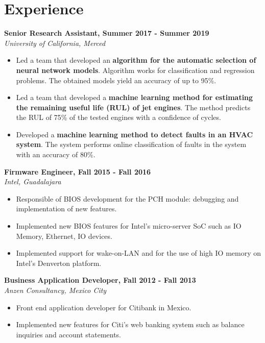 \documentclass[a4paper,10pt]{article}
\begin{document}

\begin{minipage}[H]{0.7\textwidth}%

\section{Experience}
\textbf{Senior Research Assistant, Summer 2017 - Summer 2019}\\
\emph{University of California, Merced}
\begin{itemize}
\item Led a team that developed an \textbf{algorithm for the automatic selection of neural network models}. Algorithm works for classification and regression problems. The 						obtained models yield an accuracy of up to 95\%.
\item Led a team that developed a \textbf{machine learning method for estimating the remaining useful life (RUL) of jet engines}. The method predicts the RUL of 75\% of the 							tested engines with a confidence of  cycles.
\item Developed a \textbf{machine learning method to detect faults in an HVAC system}. The system performs online classification of faults in the system with an accuracy of 80\%.
\end{itemize}

\textbf{Firmware Engineer, Fall 2015 - Fall 2016}\\
\emph{Intel, Guadalajara}
\begin{itemize}
\item Responsible of BIOS development for the PCH module: debugging and implementation of new features.
\item Implemented new BIOS features for Intel's micro-server SoC such as IO Memory, Ethernet, IO devices.
\item Implemented support for wake-on-LAN and for the use of high IO memory on Intel's Denverton platform.
\end{itemize}

\textbf{Business Application Developer, Fall 2012 - Fall 2013}\\
\emph{Anzen Consultancy, Mexico City}
\begin{itemize}
\item Front end application developer for Citibank in Mexico.
\item Implemented new features for Citi's web banking system such as balance inquiries and account statements.
\end{itemize}



\end{minipage}
\end{document}
